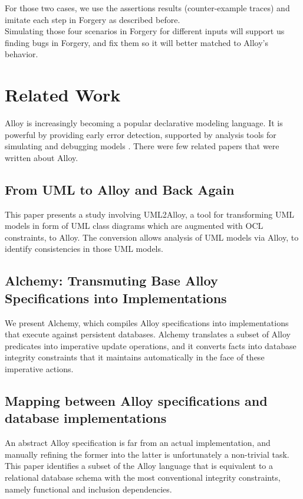 \documentclass[oneside]{book}
\begin{document}
For those two cases, we use the assertions results (counter-example traces) and imitate each step in Forgery as described before.\\

Simulating those four scenarios in Forgery for different inputs will support us finding bugs in Forgery, and fix them so it will better matched to Alloy's behavior.

\newpage

\chapter{Related Work}

Alloy is increasingly becoming a popular declarative modeling language. It is powerful by providing early error detection, supported by analysis tools for simulating and debugging models \cite{lightning}. There were few related papers that were written about Alloy.

\section{From UML to Alloy and Back Again}
This paper presents a study involving UML2Alloy, a tool for transforming
UML models in form of UML class diagrams which are augmented with
OCL constraints, to Alloy. The conversion allows analysis of UML models
via Alloy, to identify consistencies in those UML models.

\section{Alchemy: Transmuting Base Alloy Specifications into Implementations}
We present Alchemy, which compiles Alloy specifications into implementations that execute against persistent databases. Alchemy translates a subset of Alloy predicates into imperative update operations, and it converts facts into database integrity constraints that it maintains automatically in the face of these imperative actions.

\section{Mapping between Alloy specifications and database implementations}
An abstract Alloy specification is far from an actual implementation, and manually refining the former into the latter is unfortunately a non-trivial task. This paper identifies a subset of the Alloy language that is equivalent to a relational database schema with the most conventional integrity constraints, namely functional and inclusion dependencies.
\end{document}
